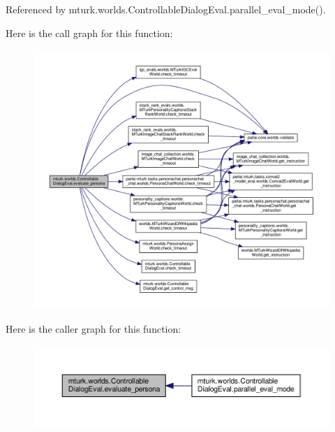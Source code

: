 Referenced by mturk.\+worlds.\+Controllable\+Dialog\+Eval.\+parallel\+\_\+eval\+\_\+mode().

Here is the call graph for this function\+:
\nopagebreak
\begin{figure}[H]
\begin{center}
\leavevmode
\includegraphics[width=350pt]{classmturk_1_1worlds_1_1ControllableDialogEval_aced8844b17899e1cc4c920a72cb490a4_cgraph}
\end{center}
\end{figure}
Here is the caller graph for this function\+:
\nopagebreak
\begin{figure}[H]
\begin{center}
\leavevmode
\includegraphics[width=350pt]{classmturk_1_1worlds_1_1ControllableDialogEval_aced8844b17899e1cc4c920a72cb490a4_icgraph}
\end{center}
\end{figure}
\mbox{\label{classmturk_1_1worlds_1_1ControllableDialogEval_a06569ce7ce50e5bc930bf699c4a70167}} 
